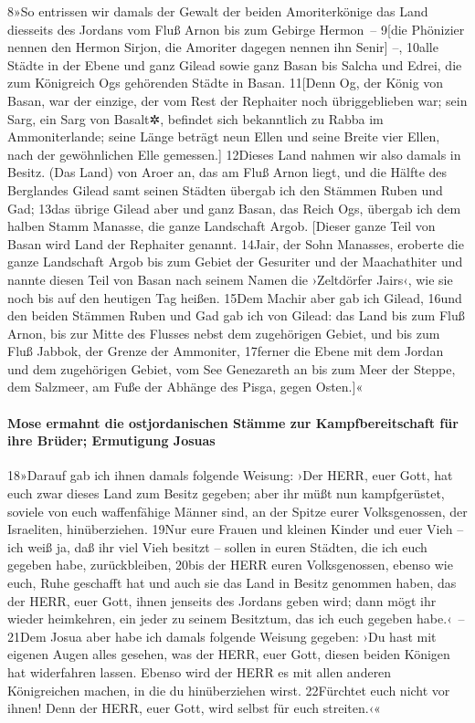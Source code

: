 8»So entrissen wir damals der Gewalt der beiden Amoriterkönige das Land
diesseits des Jordans vom Fluß Arnon bis zum Gebirge Hermon~-- 9{[}die
Phönizier nennen den Hermon Sirjon, die Amoriter dagegen nennen ihn
Senir{]} --, 10alle Städte in der Ebene und ganz Gilead sowie ganz Basan
bis Salcha und Edrei, die zum Königreich Ogs gehörenden Städte in Basan.
11{[}Denn Og, der König von Basan, war der einzige, der vom Rest der
Rephaiter noch übriggeblieben war; sein Sarg, ein Sarg von Basalt✲,
befindet sich bekanntlich zu Rabba im Ammoniterlande; seine Länge
beträgt neun Ellen und seine Breite vier Ellen, nach der gewöhnlichen
Elle gemessen.{]} 12Dieses Land nahmen wir also damals in Besitz. (Das
Land) von Aroer an, das am Fluß Arnon liegt, und die Hälfte des
Berglandes Gilead samt seinen Städten übergab ich den Stämmen Ruben und
Gad; 13das übrige Gilead aber und ganz Basan, das Reich Ogs, übergab ich
dem halben Stamm Manasse, die ganze Landschaft Argob. {[}Dieser ganze
Teil von Basan wird Land der Rephaiter genannt. 14Jair, der Sohn
Manasses, eroberte die ganze Landschaft Argob bis zum Gebiet der
Gesuriter und der Maachathiter und nannte diesen Teil von Basan nach
seinem Namen die ›Zeltdörfer Jairs‹, wie sie noch bis auf den heutigen
Tag heißen. 15Dem Machir aber gab ich Gilead, 16und den beiden Stämmen
Ruben und Gad gab ich von Gilead: das Land bis zum Fluß Arnon, bis zur
Mitte des Flusses nebst dem zugehörigen Gebiet, und bis zum Fluß Jabbok,
der Grenze der Ammoniter, 17ferner die Ebene mit dem Jordan und dem
zugehörigen Gebiet, vom See Genezareth an bis zum Meer der Steppe, dem
Salzmeer, am Fuße der Abhänge des Pisga, gegen Osten.{]}«

\hypertarget{mose-ermahnt-die-ostjordanischen-stuxe4mme-zur-kampfbereitschaft-fuxfcr-ihre-bruxfcder-ermutigung-josuas}{%
\paragraph{Mose ermahnt die ostjordanischen Stämme zur Kampfbereitschaft
für ihre Brüder; Ermutigung
Josuas}\label{mose-ermahnt-die-ostjordanischen-stuxe4mme-zur-kampfbereitschaft-fuxfcr-ihre-bruxfcder-ermutigung-josuas}}

18»Darauf gab ich ihnen damals folgende Weisung: ›Der HERR, euer Gott,
hat euch zwar dieses Land zum Besitz gegeben; aber ihr müßt nun
kampfgerüstet, soviele von euch waffenfähige Männer sind, an der Spitze
eurer Volksgenossen, der Israeliten, hinüberziehen. 19Nur eure Frauen
und kleinen Kinder und euer Vieh -- ich weiß ja, daß ihr viel Vieh
besitzt -- sollen in euren Städten, die ich euch gegeben habe,
zurückbleiben, 20bis der HERR euren Volksgenossen, ebenso wie euch, Ruhe
geschafft hat und auch sie das Land in Besitz genommen haben, das der
HERR, euer Gott, ihnen jenseits des Jordans geben wird; dann mögt ihr
wieder heimkehren, ein jeder zu seinem Besitztum, das ich euch gegeben
habe.‹~-- 21Dem Josua aber habe ich damals folgende Weisung gegeben: ›Du
hast mit eigenen Augen alles gesehen, was der HERR, euer Gott, diesen
beiden Königen hat widerfahren lassen. Ebenso wird der HERR es mit allen
anderen Königreichen machen, in die du hinüberziehen wirst. 22Fürchtet
euch nicht vor ihnen! Denn der HERR, euer Gott, wird selbst für euch
streiten.‹«

